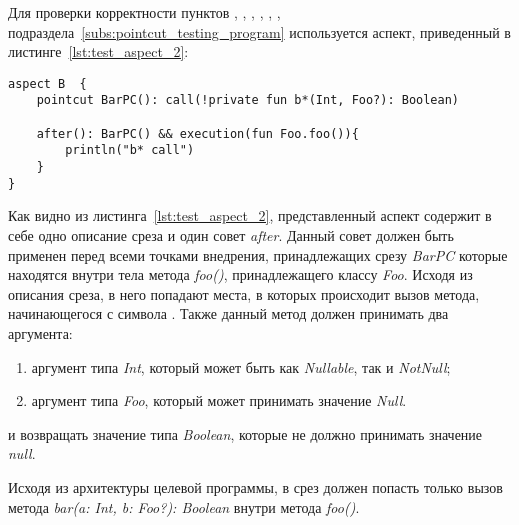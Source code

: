  Для проверки корректности пунктов
 \quotes{\ref{list:method_name_check}},
 \quotes{\ref{list:class_name_check}},
 \quotes{\ref{list:method_modifiers_check}},
 \quotes{\ref{list:method_return_value_check}},
 \quotes{\ref{list:execution_check}},
 \quotes{\ref{list:reference_pointcut_check}},
 \quotes{\ref{list:logic_operations_check}} подраздела~\ref{subs:pointcut_testing_program} используется аспект, приведенный в листинге~\ref{lst:test_aspect_2}:
\begin{lstlisting}[style={java}, label={lst:test_aspect_2},
  caption={Пример тестового аспекта}]
aspect B  {
    pointcut BarPC(): call(!private fun b*(Int, Foo?): Boolean)

    after(): BarPC() && execution(fun Foo.foo()){
        println("b* call")
    }
}
\end{lstlisting}
Как видно из листинга~\ref{lst:test_aspect_2}, представленный аспект содержит в себе одно описание среза и один совет \textit{after}.
Данный совет должен быть применен перед всеми точками внедрения, принадлежащих срезу \textit{BarPC} которые находятся внутри тела метода \textit{foo()}, принадлежащего классу \textit{Foo}.
Исходя из описания среза, в него попадают места, в которых происходит вызов метода, начинающегося с символа .
Также данный метод должен принимать два аргумента:
\begin{enumerate}
	\item аргумент типа \textit{Int}, который может быть как \textit{Nullable}, так и \textit{NotNull};
	\item аргумент типа \textit{Foo}, который может принимать значение \textit{Null}.
\end{enumerate}
и возвращать значение типа \textit{Boolean}, которые не должно принимать значение \textit{null}.

Исходя из архитектуры целевой программы, в срез должен попасть только вызов метода \textit{bar(a: Int, b: Foo?): Boolean} внутри метода \textit{foo()}.

